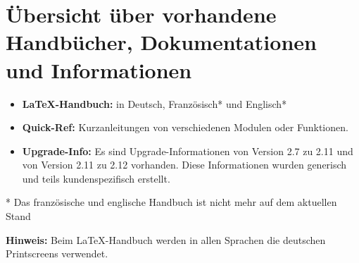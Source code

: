 \vspace{\baselineskip}
\vspace{\baselineskip}



\section{Übersicht über vorhandene Handbücher, Dokumentationen und Informationen}


\begin{itemize}
	\item \textbf{\LaTeX-Handbuch:} in Deutsch, Französisch* und Englisch*
	\item \textbf{Quick-Ref:} Kurzanleitungen von verschiedenen Modulen oder Funktionen.
	\item \textbf{Upgrade-Info:} Es sind Upgrade-Informationen von Version 2.7 zu 2.11 und von Version 2.11 zu 2.12 vorhanden. Diese Informationen wurden generisch und teils kundenspezifisch erstellt.
\end{itemize}

\vspace{\baselineskip}

* Das französische und englische Handbuch ist nicht mehr auf dem aktuellen Stand

\vspace{\baselineskip}

\textbf{Hinweis:} Beim \LaTeX-Handbuch werden in allen Sprachen die deutschen Printscreens verwendet.


